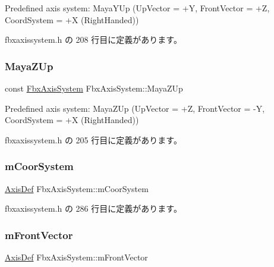 Predefined axis system\+: Maya\+Y\+Up (Up\+Vector = +Y, Front\+Vector = +Z, Coord\+System = +X (Right\+Handed)) 



 fbxaxissystem.\+h の 208 行目に定義があります。

\mbox{\label{class_fbx_axis_system_af6d2329b82cd505ae9816810f9d26bd6}} 
\subsubsection{\texorpdfstring{Maya\+Z\+Up}{MayaZUp}}
{\footnotesize\ttfamily const \hyperlink{class_fbx_axis_system}{Fbx\+Axis\+System} Fbx\+Axis\+System\+::\+Maya\+Z\+Up\hspace{0.3cm}{\ttfamily [static]}}



Predefined axis system\+: Maya\+Z\+Up (Up\+Vector = +Z, Front\+Vector = -\/Y, Coord\+System = +X (Right\+Handed)) 



 fbxaxissystem.\+h の 205 行目に定義があります。

\mbox{\label{class_fbx_axis_system_ac6a0711045499b8e4f699019e3c7fe0e}} 
\subsubsection{\texorpdfstring{m\+Coor\+System}{mCoorSystem}}
{\footnotesize\ttfamily \hyperlink{class_fbx_axis_system_1_1_axis_def}{Axis\+Def} Fbx\+Axis\+System\+::m\+Coor\+System\hspace{0.3cm}{\ttfamily [protected]}}



 fbxaxissystem.\+h の 286 行目に定義があります。

\mbox{\label{class_fbx_axis_system_a8d26e8fb0d5e47bc2e7f667a7b288a5b}} 
\subsubsection{\texorpdfstring{m\+Front\+Vector}{mFrontVector}}
{\footnotesize\ttfamily \hyperlink{class_fbx_axis_system_1_1_axis_def}{Axis\+Def} Fbx\+Axis\+System\+::m\+Front\+Vector\hspace{0.3cm}{\ttfamily [protected]}}



